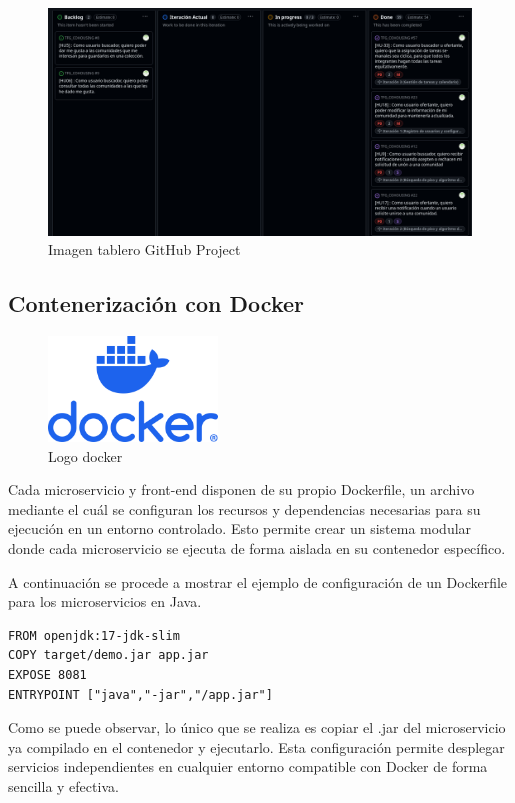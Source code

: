 \begin{figure}[H]
  \centering
  \includegraphics[width=1\textwidth]{fotos/backlog-github.png}
  \caption{Imagen tablero GitHub Project}
\end{figure}

\subsection{Contenerización con Docker}
\begin{figure}[H]
  \centering
  \includegraphics[width=0.4\textwidth]{fotos/docker.png}
  \caption{Logo docker}
\end{figure}
Cada microservicio y front-end disponen de su propio Dockerfile\cite{docker}, un archivo mediante el cuál se configuran los recursos y dependencias necesarias para su ejecución en un entorno controlado.
Esto permite crear un sistema modular donde cada microservicio se ejecuta de forma aislada en su contenedor específico. 

A continuación se procede a mostrar el ejemplo de configuración de un Dockerfile para los microservicios en Java.
\begin{verbatim}
FROM openjdk:17-jdk-slim
COPY target/demo.jar app.jar
EXPOSE 8081
ENTRYPOINT ["java","-jar","/app.jar"]
\end{verbatim}

Como se puede observar, lo único que se realiza es copiar el .jar del microservicio ya compilado en el contenedor y ejecutarlo. Esta configuración permite desplegar servicios independientes en cualquier entorno compatible con Docker de forma sencilla y efectiva.

